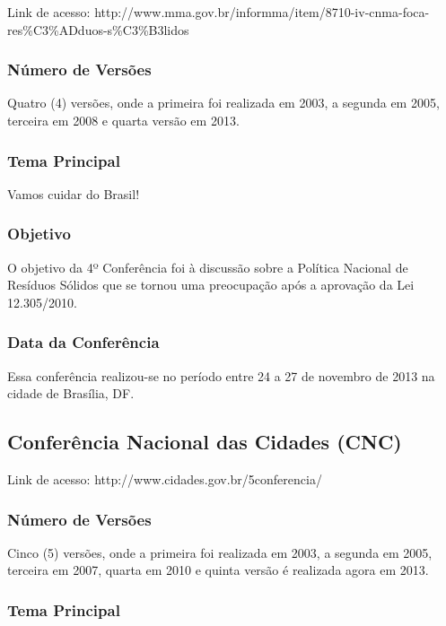 Link de acesso: http://www.mma.gov.br/informma/item/8710-iv-cnma-foca-res\%C3\%ADduos-s\%C3\%B3lidos

\subsubsection*{Número de Versões}

Quatro (4) versões, onde a primeira foi realizada em 2003, a segunda
em 2005, terceira em 2008 e quarta versão em 2013.

\subsubsection*{Tema Principal}

Vamos cuidar do Brasil!

\subsubsection*{Objetivo}

O objetivo da 4º Conferência foi à discussão
sobre a Política Nacional de Resíduos Sólidos que se tornou uma
preocupação após a aprovação da Lei 12.305/2010.

\subsubsection*{Data da Conferência}

Essa conferência realizou-se no período entre 24 a 27 de novembro de
2013 na cidade de Brasília, DF.

\newpage
\subsection*{Conferência Nacional das Cidades (CNC)}

Link de acesso: http://www.cidades.gov.br/5conferencia/

\subsubsection*{Número de Versões}

Cinco (5) versões, onde a primeira foi realizada em 2003, a segunda em
2005, terceira em 2007, quarta em 2010 e quinta versão é realizada
agora em 2013.

\subsubsection*{Tema Principal}

